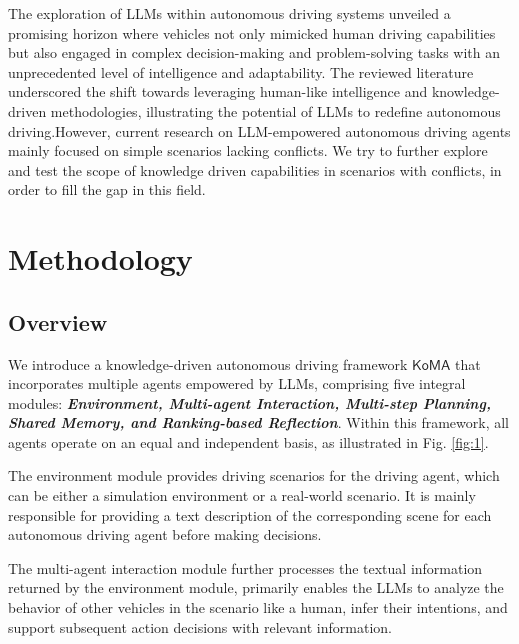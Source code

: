 \documentclass[lettersize,journal]{IEEEtran}
\begin{document}
The exploration of LLMs within autonomous driving systems unveiled a promising horizon where vehicles not only mimicked human driving capabilities but also engaged in complex decision-making and problem-solving tasks with an unprecedented level of intelligence and adaptability. The reviewed literature underscored the shift towards leveraging human-like intelligence and knowledge-driven methodologies, illustrating the potential of LLMs to redefine autonomous driving.However, current research on LLM-empowered autonomous driving agents mainly focused on simple scenarios lacking conflicts. We try to further explore and test the scope of knowledge driven capabilities in scenarios with conflicts, in order to fill the gap in this field.


\section{Methodology}
\subsection{Overview}
We introduce a knowledge-driven autonomous driving framework $\mathsf{KoMA}$ that incorporates multiple agents empowered by LLMs, comprising five integral modules: \textbf{\textit{Environment, Multi-agent Interaction, Multi-step Planning, Shared Memory, and Ranking-based Reflection}}. Within this framework, all agents operate on an equal and independent basis, as illustrated in Fig. \ref{fig:1}.


The environment module provides driving scenarios for the driving agent, which can be either a simulation environment or a real-world scenario. It is mainly responsible for providing a text description of the corresponding scene for each autonomous driving agent before making decisions.

The multi-agent interaction module further processes the textual information returned by the environment module, primarily enables the LLMs to analyze the behavior of other vehicles in the scenario like a human, infer their intentions, and support subsequent action decisions with relevant information.
\end{document}
